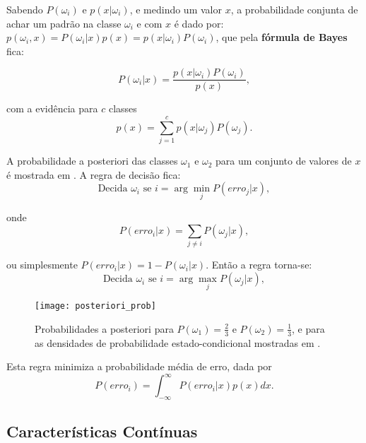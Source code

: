 Sabendo $P(\omega_i)$ e $p(x|\omega_i)$, e medindo um valor $x$, a probabilidade conjunta de achar um padrão na classe $\omega_i$ e com $x$ é dado por: $p(\omega_i,x) = P(\omega_i|x)p(x) = p(x|\omega_i)P(\omega_i)$, que pela \textbf{fórmula de Bayes} fica:

\begin{equation}
    P(\omega_i|x) = \frac{p(x|\omega_i)P(\omega_i)}{p(x)},
    \label{eq:bayes}
\end{equation}

\noindent com a evidência para $c$ classes
\begin{equation}
    p(x) = \sum_{j=1}^c p(x|\omega_j)P(\omega_j).
    \label{eq:bayes}
\end{equation}

A probabilidade a posteriori das classes $\omega_1$ e $\omega_2$ para um conjunto de valores de $x$ é mostrada em . A regra de decisão fica:
\begin{equation}
    \text{Decida } \omega_i \text{ se } i = \arg\min_j P(erro_j|x),
    \label{eq:decision_2}
\end{equation}

\noindent onde
\begin{equation}
    P(erro_i|x) = \sum_{j\neq i} P(\omega_j|x),
    \label{eq:bayes}
\end{equation}

\noindent ou simplesmente $P(erro_i|x) = 1 - P(\omega_i|x)$. Então a regra torna-se:
\begin{equation}
    \text{Decida } \omega_i \text{ se } i = \arg\max_j P(\omega_j|x),
    \label{eq:decision_3}
\end{equation}

\begin{figure}[ht]
    \centering
    \texttt{[image: posteriori\_prob]}
    \caption{Probabilidades a posteriori para $P(\omega_1) = \frac{2}{3}$ e $P(\omega_2) = \frac{1}{3}$, e para as densidades de probabilidade estado-condicional mostradas em .}
    \label{fig:posteriori_prob}
\end{figure}

Esta regra minimiza a probabilidade média de erro, dada por
\begin{equation}
    P(erro_i) = \int_{-\infty}^{\infty} P(erro_i|x)p(x) dx.
    \label{eq:bayes}
\end{equation}

\subsection{Características Contínuas}

